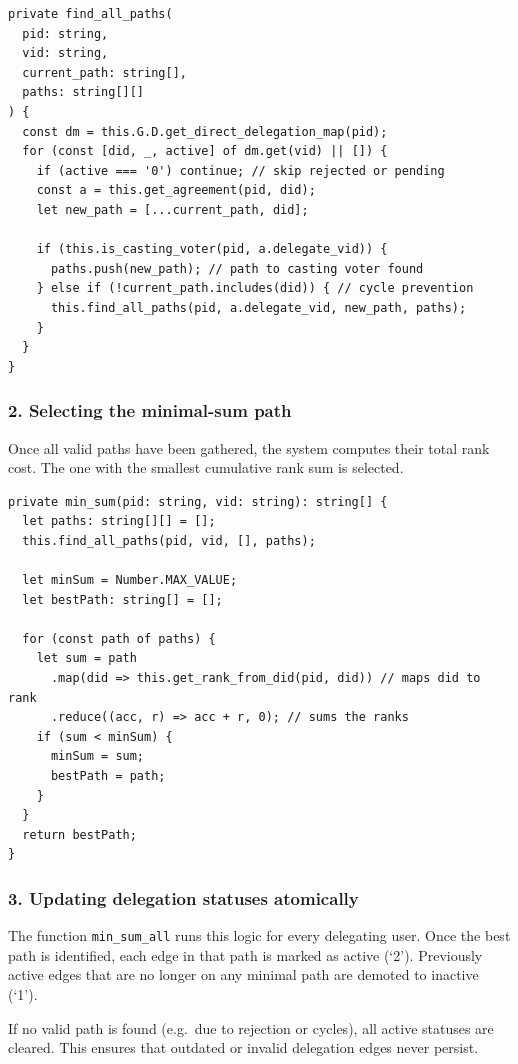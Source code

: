 \begin{verbatim}
private find_all_paths(
  pid: string,
  vid: string,
  current_path: string[],
  paths: string[][]
) {
  const dm = this.G.D.get_direct_delegation_map(pid);
  for (const [did, _, active] of dm.get(vid) || []) {
    if (active === '0') continue; // skip rejected or pending
    const a = this.get_agreement(pid, did);
    let new_path = [...current_path, did];

    if (this.is_casting_voter(pid, a.delegate_vid)) {
      paths.push(new_path); // path to casting voter found
    } else if (!current_path.includes(did)) { // cycle prevention
      this.find_all_paths(pid, a.delegate_vid, new_path, paths);
    }
  }
}
\end{verbatim}

\subsubsection*{2. Selecting the minimal-sum path}

Once all valid paths have been gathered, the system computes their total rank cost. The one with the smallest cumulative rank sum is selected.

\begin{verbatim}
private min_sum(pid: string, vid: string): string[] {
  let paths: string[][] = [];
  this.find_all_paths(pid, vid, [], paths);

  let minSum = Number.MAX_VALUE;
  let bestPath: string[] = [];

  for (const path of paths) {
    let sum = path
      .map(did => this.get_rank_from_did(pid, did)) // maps did to rank
      .reduce((acc, r) => acc + r, 0); // sums the ranks
    if (sum < minSum) {
      minSum = sum;
      bestPath = path;
    }
  }
  return bestPath;
}
\end{verbatim}

\subsubsection*{3. Updating delegation statuses atomically}

The function \texttt{min\_sum\_all} runs this logic for every delegating user. Once the best path is identified, each edge in that path is marked as active (`2'). Previously active edges that are no longer on any minimal path are demoted to inactive (`1').

If no valid path is found (e.g.\ due to rejection or cycles), all active statuses are cleared. This ensures that outdated or invalid delegation edges never persist.

